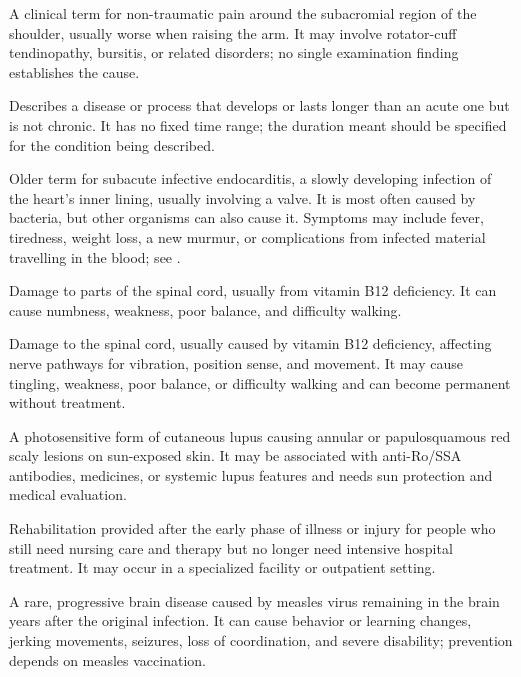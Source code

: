  A clinical term for non-traumatic pain around the subacromial region of the shoulder, usually worse when raising the arm. It may involve rotator-cuff tendinopathy, bursitis, or related disorders; no single examination finding establishes the cause.

 Describes a disease or process that develops or lasts longer than an acute one but is not chronic. It has no fixed time range; the duration meant should be specified for the condition being described.

 Older term for subacute infective endocarditis, a slowly developing infection of the heart's inner lining, usually involving a valve. It is most often caused by bacteria, but other organisms can also cause it. Symptoms may include fever, tiredness, weight loss, a new murmur, or complications from infected material travelling in the blood; see .

 Damage to parts of the spinal cord, usually from vitamin B12 deficiency. It can cause numbness, weakness, poor balance, and difficulty walking.

 Damage to the spinal cord, usually caused by vitamin B12 deficiency, affecting nerve pathways for vibration, position sense, and movement. It may cause tingling, weakness, poor balance, or difficulty walking and can become permanent without treatment.

 A photosensitive form of cutaneous lupus causing annular or papulosquamous red scaly lesions on sun-exposed skin. It may be associated with anti-Ro/SSA antibodies, medicines, or systemic lupus features and needs sun protection and medical evaluation.

 Rehabilitation provided after the early phase of illness or injury for people who still need nursing care and therapy but no longer need intensive hospital treatment. It may occur in a specialized facility or outpatient setting.

 A rare, progressive brain disease caused by measles virus remaining in the brain years after the original infection. It can cause behavior or learning changes, jerking movements, seizures, loss of coordination, and severe disability; prevention depends on measles vaccination.

